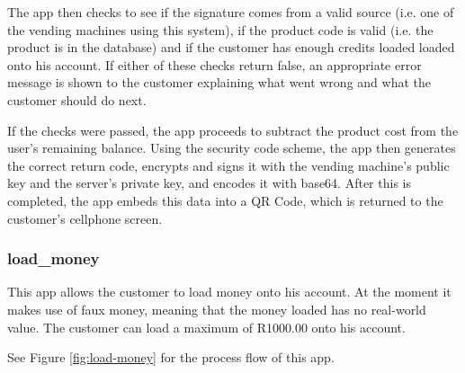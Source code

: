 The app then checks to see if the signature comes from a valid source (i.e. one of the vending
machines using this system), if the product code is valid (i.e. the product is in the database)
and if the customer has enough credits loaded loaded onto his account. If either of these
checks return false, an appropriate error message is shown to the customer explaining what
went wrong and what the customer should do next.

If the checks were passed, the app proceeds to subtract the product cost from the user's
remaining balance. Using the security code scheme, the app then generates the correct return
code, encrypts and signs it with the vending machine's public key and the server's private key,
and encodes it with base64. After this is completed, the app embeds this data into a QR Code,
which is returned to the customer's cellphone screen. 

\subsubsection{load\_money}

This app allows the customer to load money onto his account. At the moment it makes use of
faux money, meaning that the money loaded has no real-world value. The customer can load a
maximum of R1000.00 onto his account.

See Figure \ref{fig:load-money} for the process flow of this
app.

